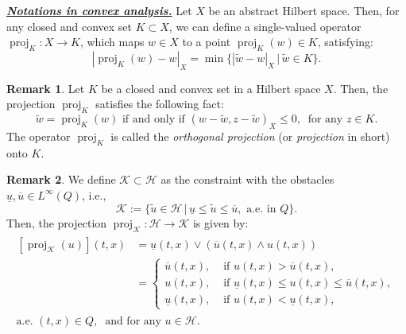 \documentclass{sinst}
\numberwithin{equation}{section}
\theoremstyle{plain}
\theoremstyle{definition}
\newtheorem{rem}{Remark}
\def\sH{\mathscr{H}}
\def\sK{\mathscr{K}}
\DeclareMathOperator{\proj}{proj}
\begin{document}
\noindent
\underline{\textbf{\textit{Notations in convex analysis.}}}
Let $X$ be an abstract Hilbert space. Then, for any closed and convex set $K \subset X$, we can define a single-valued operator $\proj_K:X \longrightarrow K$, which maps $w \in X$ to a point $\proj_K(w) \in K$, satisfying:
\begin{equation}
    |\proj_K(w) - w|_X = \min \{ |\tilde w - w|_X \,|\, \tilde w \in K \}.
\end{equation}

\begin{rem}
    Let $K$ be a closed and convex set in a Hilbert space $X$. Then, the projection $\proj_K$ satisfies the following fact:
    \begin{equation}
        \tilde w = \proj_K(w) \mbox{ if and only if } (w - \tilde w, z - \tilde w)_X \leq 0, \ \mbox{ for any } z \in K. \label{proj01}
    \end{equation}
    The operator $\proj_K$ is called the \textit{orthogonal projection} (or \textit{projection} in short) onto $K$.
\end{rem}

\begin{rem} \label{constraint}
    We define $\sK \subset \sH$ as the constraint with the obstacles $\underline{u}, \overline{u} \in L^\infty(Q)$, i.e.,
    \begin{equation}
        \sK := \{ \tilde u \in \sH \,| \, \underline{u} \leq \tilde u \leq \overline{u}, \mbox{ a.e. in } Q \}. 
    \end{equation}
    Then, the projection $\proj_\sK: \sH \longrightarrow \sK$ is given by:
    \begin{gather}
        \begin{aligned}
            [\proj_\sK(u)](t,x) &= \underline{u}(t,x) \vee (\overline{u}(t,x) \wedge u(t,x))
            \\
            &= \begin{cases}
                \overline{u}(t,x), &\mbox{ if } u(t,x) > \overline{u}(t,x),
                \\
                u(t,x), & \mbox{ if } \underline{u}(t,x) \leq u(t,x) \leq \overline{u}(t,x),
                \\
                \underline{u}(t,x), & \mbox{ if } u(t,x) < \underline{u}(t,x),
            \end{cases}
        \end{aligned}
        \\
        \mbox{ a.e. } (t,x) \in Q, \ \mbox{ and for any } u \in \sH.
    \end{gather}
\end{rem}
\end{document}
